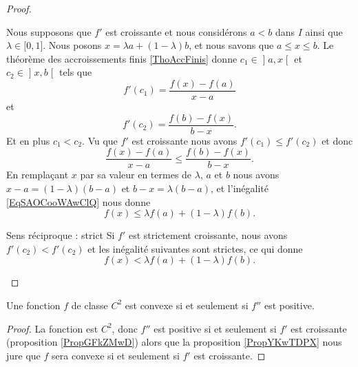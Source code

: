 \begin{proof}
\begin{subproof}
             Nous supposons que \( f'\) est croissante et nous considérons \( a<b\) dans \( I\) ainsi que \( \lambda\in \mathopen[ 0 , 1 \mathclose]\). Nous posons \( x=\lambda a+(1-\lambda)b\), et nous savons que \( a\leq x\leq b\). Le théorème des accroissements finis \ref{ThoAccFinis} donne \( c_1\in\mathopen] a , x \mathclose[\) et \( c_2\in \mathopen] x , b \mathclose[\) tels que
                 \begin{equation}
                     f'(c_1)=\frac{ f(x)-f(a) }{ x-a }
                 \end{equation}
                 et 
                 \begin{equation}
                     f'(c_2)=\frac{ f(b)-f(x) }{ b-x }.
                 \end{equation}
                 Et en plus \( c_1<c_2\). Vu que \( f'\) est croissante nous avons \( f'(c_1)\leq f'(c_2)\) et donc
                 \begin{equation}       \label{EqSAOCooWAwClQ}
                     \frac{ f(x)-f(a) }{ x-a }\leq\frac{ f(b)-f(x) }{ b-x }.
                 \end{equation}
                 En remplaçant \( x\) par sa valeur en termes de \( \lambda\), \( a\) et \( b\) nous avons \( x-a=(1-\lambda)(b-a)\) et \( b-x=\lambda(b-a)\), et l'inégalité \eqref{EqSAOCooWAwClQ} nous donne
                 \begin{equation}
                     f(x)\leq \lambda f(a)+(1-\lambda)f(b).
                 \end{equation}
             \item[Sens réciproque : strict]
                 Si \( f'\) est strictement croissante, nous avons \( f'(c_2)<f'(c_2)\) et les inégalité suivantes sont strictes, ce qui donne
                 \begin{equation}
                     f(x)< \lambda f(a)+(1-\lambda)f(b).
                 \end{equation}
    \end{subproof}
\end{proof}

\begin{theorem} \label{ThoGXjKeYb}
    Une fonction \( f\) de classe \( C^2\) est convexe si et seulement si \( f''\) est positive.
\end{theorem}

\begin{proof}
    La fonction est \( C^2\), donc \( f''\) est positive si et seulement si \( f'\) est croissante (proposition \ref{PropGFkZMwD}) alors que la proposition \ref{PropYKwTDPX} nous jure que \( f\) sera convexe si et seulement si \( f'\) est croissante.
\end{proof}

